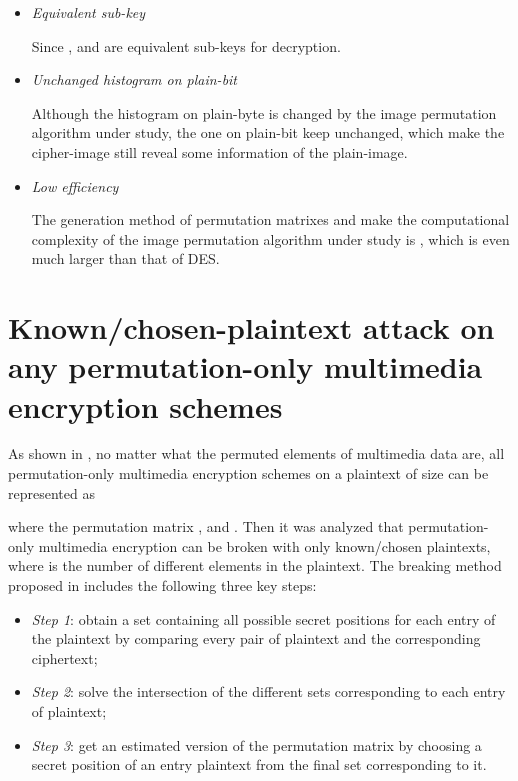 \documentclass[3p,preprint,11pt]{elsarticle}
\begin{document}
\begin{itemize}
\item \textit{Equivalent sub-key}

Since ,  and  are equivalent sub-keys for
decryption.

\item \textit{Unchanged histogram on plain-bit}

Although the histogram on plain-byte is changed by the image
permutation algorithm under study, the one on plain-bit keep
unchanged, which make the cipher-image still reveal some information
of the plain-image.

\item \textit{Low efficiency}

The generation method of permutation matrixes  and
 make the computational complexity of the image
permutation algorithm under study is , which is
even much larger than that of DES.
\end{itemize}

\section{Known/chosen-plaintext attack on any permutation-only multimedia encryption schemes}
\label{sec:AttackAnyPermuation}

As shown in \cite{Li:AttackingPOMC2008}, no matter what the
permuted elements of multimedia data are, all permutation-only
multimedia encryption schemes on a plaintext of size  can
be represented as

where the permutation matrix
,  and
. Then it was analyzed that
permutation-only multimedia encryption can be broken with only
 known/chosen plaintexts, where  is the number of
different elements in the plaintext. The breaking method proposed in
\cite[Sec. 3.1]{Li:AttackingPOMC2008} includes the following three
key steps:

\begin{itemize}
\item \textit{Step 1}: obtain a set containing all possible secret positions for each entry of the
plaintext by comparing every pair of plaintext and the corresponding
ciphertext;

\item \textit{Step 2}: solve the intersection of the different sets
corresponding to each entry of plaintext;

\item \textit{Step 3}: get an estimated version of the permutation
matrix by choosing a secret position of an entry plaintext from the
final set corresponding to it.
\end{itemize}
\end{document}
